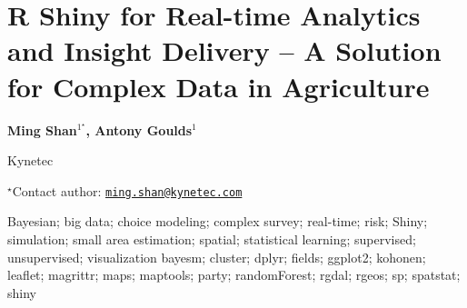 \documentclass[\main/boa.tex]{subfiles}
\begin{document}
\section{R Shiny for Real-time Analytics and Insight Delivery -- A Solution for
Complex Data in Agriculture}

\begin{center}
  {\bf {} Ming Shan$^{1^\star}$,  Antony Goulds$^{1}$}
\end{center}

\vskip 0.3cm

\begin{affiliations}
\begin{enumerate}
\begin{minipage}{0.915\textwidth}
\centering
\item Kynetec \\[-2pt]
\end{minipage}
\end{enumerate}
$^\star$Contact author: \href{mailto:ming.shan@kynetec.com}{\nolinkurl{ming.shan@kynetec.com}}\\
\end{affiliations}

\vskip 0.5cm

\begin{minipage}{0.915\textwidth}
\keywords Bayesian; big data; choice modeling; complex survey; real-time; risk; Shiny;
simulation; small area estimation; spatial; statistical learning;
supervised; unsupervised; visualization
\packages {} bayesm;  cluster;  dplyr;  fields;  ggplot2;  kohonen;  leaflet;  magrittr;  maps;  maptools;  party;  randomForest;  rgdal;  rgeos;  sp;  spatstat;  shiny
\end{minipage}

\vskip 0.8cm
\end{document}
